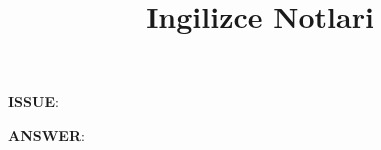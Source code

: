 \documentclass[12pt, a4paper]{ximera}
\title{Ingilizce Notlari}
\begin{document}
\textbf{ISSUE}: \textit{}

\textbf{ANSWER}: 
\end{document}
